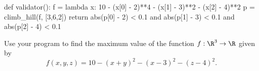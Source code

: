 \documentclass{ximera}
\begin{document}
\begin{question}
\begin{solution}
\begin{python}
def validator():
  f = lambda x: 10 - (x[0] - 2)**4 - (x[1] - 3)**2 - (x[2] - 4)**2
  p = climb_hill(f, [3,6,2])
  return abs(p[0] - 2) < 0.1 and abs(p[1] - 3) < 0.1 and abs(p[2] - 4) < 0.1
    \end{python}
  \end{solution}

Use your program to find the maximum value of the function $f : \R^3 \to \R$ given by
$$
f(x,y,z) = 10 - (x+y)^2 - (x-3)^2 - (z-4)^2.
$$

\end{question}
\end{document}

